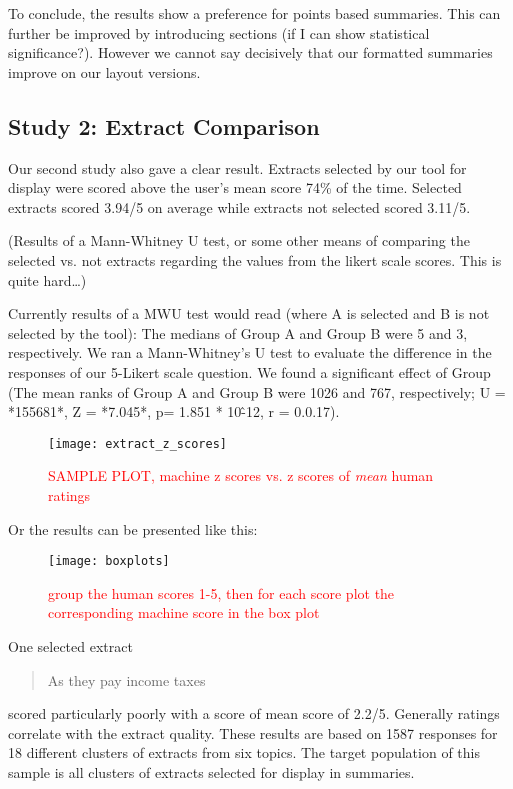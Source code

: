       To conclude, the results show a preference for points based summaries. This can further be improved by introducing sections (if I can show statistical significance?). However we cannot say decisively that our formatted summaries improve on our layout versions.

    \tocless\subsection{Study 2: Extract Comparison}
      Our second study also gave a clear result. Extracts selected by our tool for display were scored above the user's mean score 74\% of the time. Selected extracts scored 3.94/5 on average while extracts not selected scored 3.11/5.

      (Results of a Mann-Whitney U test, or some other means of comparing the selected vs. not extracts regarding the values from the likert scale scores. This is quite hard\dots)

      Currently results of a MWU test would read (where A is selected and B is not selected by the tool): The medians of Group A and Group B were 5 and 3, respectively. We ran a Mann-Whitney's U test to evaluate the difference in the responses of our 5-Likert scale question. We found a significant effect of Group (The mean ranks of Group A and Group B were 1026 and 767, respectively; U = *155681*, Z = *7.045*, p= 1.851 * 10\^-12, r = 0.0.17).

      \begin{figure}[h]
        \caption{\textcolor{red}{SAMPLE PLOT, machine z scores vs. z scores of \textit{mean} human ratings}}
        \centering
        \texttt{[image: extract\_z\_scores]}
      \end{figure}

      Or the results can be presented like this:
      \begin{figure}[h]
        \caption{\textcolor{red}{group the human scores 1-5, then for each score plot the corresponding machine score in the box plot}}
        \centering
        \texttt{[image: boxplots]}
      \end{figure}

      One selected extract \blockquote{As they pay income taxes} scored particularly poorly with a score of mean score of 2.2/5. Generally ratings correlate with the extract quality. These results are based on 1587 responses for 18 different clusters of extracts from six topics. The target population of this sample is all clusters of extracts selected for display in summaries.

